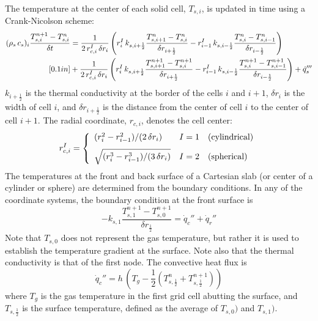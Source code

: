 The temperature at the center of each solid cell, $T_{s,i}$, is updated in time using a Crank-Nicolson scheme:
\begin{align}
\label{crank-nicolson}
(\rho_s \, c_s)_i \frac{T_{s,i}^{n+1}-T_{s,i}^{n}}{\delta t}
& = \frac{1}{2 \, r_{c,i}^I \, \delta r_i} \left( r_{i}^{I} \, k_{s,i+\frac{1}{2}} \frac{T_{s,i+1}^{n}-T_{s,i}^{n}}{\delta r_{i+\frac{1}{2}}} - r_{i-1}^{I} \, k_{s,i-\frac{1}{2}} \frac{T_{s,i}^{n}-T_{s,i-1}^{n}}{\delta r_{i-\frac{1}{2}}} \right) \notag \\ [0.1in]
& +\frac{1}{2 \, r_{c,i}^I \, \delta r_i} \left( r_{i}^{I} \, k_{s,i+\frac{1}{2}} \frac{T_{s,i+1}^{n+1}-T_{s,i}^{n+1}}{\delta r_{i+\frac{1}{2}}} - r_{i-1}^{I} \, k_{s,i-\frac{1}{2}} \frac{T_{s,i}^{n+1}-T_{s,i-1}^{n+1}}{\delta r_{i-\frac{1}{2}}} \right) + \dot{q}'''_s
\end{align}
$k_{i+\frac{1}{2}}$ is the thermal conductivity at the border of the cells $i$ and $i+1$, $\delta r_i$ is the width of cell $i$, and  $\delta r_{i+\frac{1}{2}}$ is the distance from the center of cell $i$ to the center of cell $i+1$. The radial coordinate, $r_{c,i}$, denotes the cell center:
\begin{equation}
r_{c,i}^I = \left\{
\begin{array}{ll} (r_i^2 - r_{i-1}^2)/(2 \, \delta r_i)            & I=1 \quad \hbox{(cylindrical)} \\ [0.1in]
                   \sqrt{ ( r_i^3 - r_{i-1}^3)/(3 \, \delta r_i) } & I=2 \quad \hbox{(spherical)}
\end{array} \right.
\end{equation}
The temperatures at the front and back surface of a Cartesian slab (or center of a cylinder or sphere) are determined from the boundary conditions. In any of the coordinate systems, the boundary condition at the front surface is
\begin{equation}
\label{bc_front}
 -k_{s,1} \frac{T_{s,1}^{n+1}-T_{s,0}^{n+1}}{\delta r_{\frac{1}{2}}}
  =  \dot{q}_{c}''+\dot{q}_{r}''
\end{equation}
Note that $T_{s,0}$ does not represent the gas temperature, but rather it is used to establish the temperature gradient at the surface. Note also that the thermal conductivity is that of the first node. The convective heat flux is
\begin{equation}
\label{conv}
  \dot{q}_c'' = h \, \left( T_g - \frac{1}{2} \left( T_{s,\frac{1}{2}}^n+T_{s,\frac{1}{2}}^{n+1} \right) \right)
\end{equation}
where $T_g$ is the gas temperature in the first grid cell abutting the surface, and $T_{s,\frac{1}{2}}$ is the surface temperature, defined as the average of $T_{s,0})$ and $T_{s,1})$.
